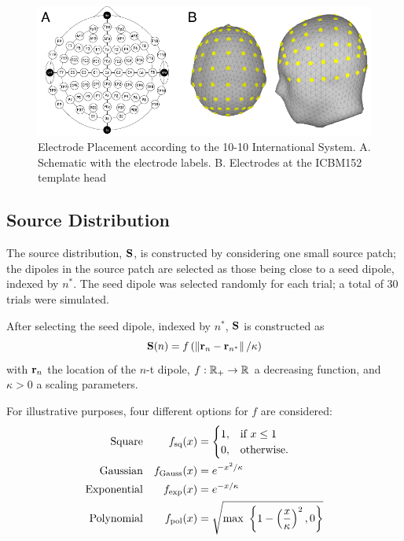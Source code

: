 \begin{figure}
\centering
\includegraphics{./img/EEG_10-10.pdf}
\caption{Electrode Placement according to the 10-10 International System. A. Schematic with the electrode labels. B. Electrodes at the ICBM152 template head}
\label{fig:1010system}
\end{figure}


\subsection{Source Distribution}

The source distribution, $\mathbf{S}$, is constructed by considering one small source patch; the dipoles in the source patch are selected as those being close to a seed dipole, indexed by $n^*$.
%
The seed dipole was selected randomly for each trial; a total of 30 trials were simulated.

After selecting the seed dipole, indexed by $n^*$, $\mathbf{S}$ is constructed as
\begin{equation}
\mathbf{S}(n) = f\left(  \left\lVert \mathbf{r}_n-\mathbf{r}_{n^*} \right\rVert / \kappa  \right)
\end{equation}
with $\mathbf{r}_n$ the location of the $n$-t dipole, $f:\mathbb{R}_+\rightarrow \mathbb{R}$ a decreasing function, and $\kappa>0$ a scaling parameters.

For illustrative purposes, four different options for $f$ are considered:
\begin{align}
\text{Square} &&
    f_\text{sq}(x) 
    &= 
    \begin{cases}
1, &\text{if } x\leq 1 \\
0, &\text{otherwise}.
\end{cases}
    \\
\text{Gaussian} &&
    f_\text{Gauss}(x) 
    &= 
    e^{-x^2/\kappa}
    \\
\text{Exponential} &&
    f_\text{exp}(x) 
    &= 
    e^{-x/\kappa}
    \\
\text{Polynomial} &&
    f_\text{pol}(x) 
    &= 
    \sqrt{ \max\,\, \left\{ 1-\left( \frac{x}{\kappa} \right)^2, 0  \right\}}
\end{align}

